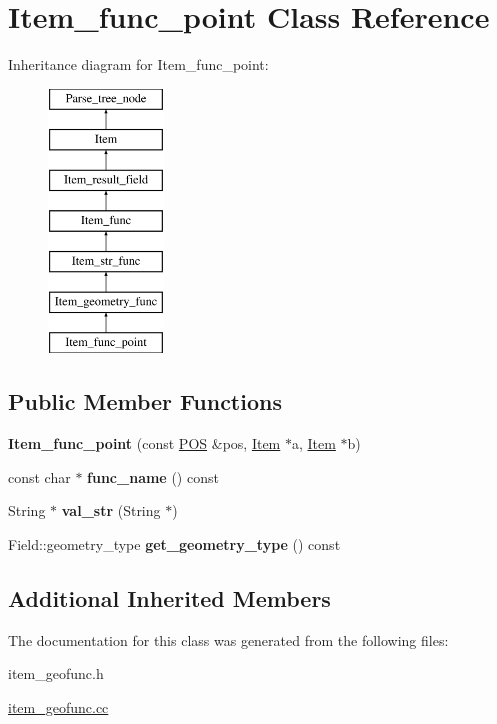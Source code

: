 \hypertarget{classItem__func__point}{}\section{Item\+\_\+func\+\_\+point Class Reference}
\label{classItem__func__point}
Inheritance diagram for Item\+\_\+func\+\_\+point\+:\begin{figure}[H]
\begin{center}
\leavevmode
\includegraphics[height=7.000000cm]{classItem__func__point}
\end{center}
\end{figure}
\subsection*{Public Member Functions}
\begin{DoxyCompactItemize}
\item 
\mbox{\label{classItem__func__point_af3305ec7ed5b3e7089f7c2bb69265853}} 
{\bfseries Item\+\_\+func\+\_\+point} (const \mbox{\hyperlink{structYYLTYPE}{P\+OS}} \&pos, \mbox{\hyperlink{classItem}{Item}} $\ast$a, \mbox{\hyperlink{classItem}{Item}} $\ast$b)
\item 
\mbox{\label{classItem__func__point_aab531aefdc5f5e732aaf4fb2cad66036}} 
const char $\ast$ {\bfseries func\+\_\+name} () const
\item 
\mbox{\label{classItem__func__point_ab6151f517b77d1b051f0dde39f4bf86b}} 
String $\ast$ {\bfseries val\+\_\+str} (String $\ast$)
\item 
\mbox{\label{classItem__func__point_ad69a0e65661f67d5fb5f2162ede915e7}} 
Field\+::geometry\+\_\+type {\bfseries get\+\_\+geometry\+\_\+type} () const
\end{DoxyCompactItemize}
\subsection*{Additional Inherited Members}


The documentation for this class was generated from the following files\+:\begin{DoxyCompactItemize}
\item 
item\+\_\+geofunc.\+h\item 
\mbox{\hyperlink{item__geofunc_8cc}{item\+\_\+geofunc.\+cc}}\end{DoxyCompactItemize}
